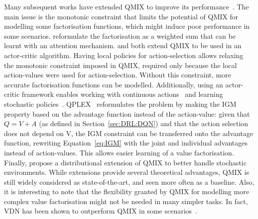 Many subsequent works have extended QMIX to improve its performance~\citep{Son2019_QTRAN, Rashid2020_WQMIX, Zhou2020_LICA, Yang2020_Qatten, Wang2021_QPLEX, Peng2021_FACMAC, Iqbal2021_REFIL, Hong2022_RethinkingIGM, Zhou2022_PAC, Sun2023_DFAC, Xu2023_DAVE}. The main issue is the monotonic constraint that limits the potential of QMIX for modelling some factorisation functions, which might induce poor performance in some scenarios. 
\citet{Yang2020_Qatten} reformulate the factorisation as a weighted sum that can be learnt with an attention mechanism. 
\citet{Zhou2020_LICA} and \citet{Peng2021_FACMAC} both extend QMIX to be used in an actor-critic algorithm. Having local policies for action-selection allows relaxing the monotonic constraint imposed in QMIX, required only because the local action-values were used for action-selection. Without this constraint, more accurate factorisation functions can be modelled. Additionally, using an actor-critic framework enables working with continuous actions~\citep{Peng2021_FACMAC} and learning stochastic policies~\citep{Zhou2020_LICA}. 
QPLEX~\citep{Wang2021_QPLEX} reformulates the problem by making the IGM property based on the advantage function instead of the action-value: given that $Q = V + A$ (as defined in Section~\ref{sec:DRL:DQN}) and that the action selection does not depend on V, the IGM constraint can be transferred onto the advantage function, rewriting Equation~\ref{eq:IGM} with the joint and individual advantages instead of action-values. This allows easier learning of a value factorisation. 
Finally, \citet{Sun2023_DFAC} propose a distributional extension of QMIX to better handle stochastic environments. 
While extensions provide several theoretical advantages, QMIX is still widely considered as state-of-the-art, and seen more often as a baseline. 
Also, it is interesting to note that the flexibility granted by QMIX for modelling more complex value factorisation might not be needed in many simpler tasks. In fact, VDN has been shown to outperform QMIX in some scenarios~\citep{Papoudakis2020_BenchmarkMADRL, Wang2021_UndestandValueFac}. 



